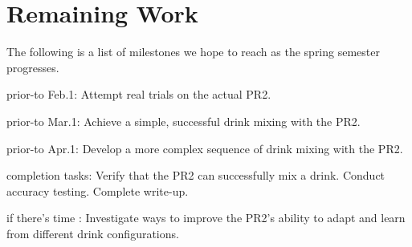 \documentclass{sig-alternate}
\begin{document}
\section{Remaining Work}
\label{sec:remaining_work}
The following is a list of milestones we hope to reach as the spring semester progresses.

\begin{itemize*}
	\item {\sc prior-to Feb.1}: Attempt real trials on the actual PR2.\vspace{3pt}
	\item {\sc prior-to Mar.1}: Achieve a simple, successful drink mixing with the PR2.\vspace{3pt}
	\item {\sc prior-to Apr.1}: Develop a more complex sequence of drink mixing with the PR2.\vspace{3pt}
	\item {\sc completion tasks}: Verify that the PR2 can successfully mix a drink. Conduct accuracy testing. Complete write-up.\vspace{3pt}
	\item {\sc if there's time} : Investigate ways to improve the PR2's ability to adapt and learn from different drink configurations.
\end{itemize*}

\end{document}
